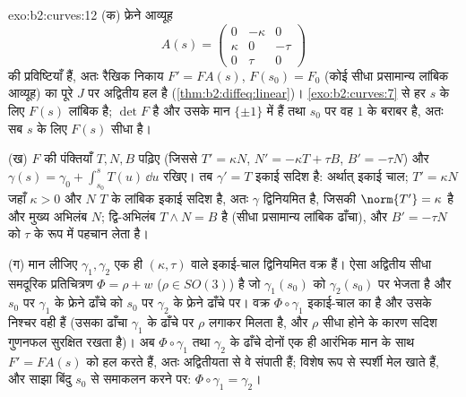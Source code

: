 \begin{solution}{exo:b2:curves:12}
(क) फ्रेने आव्यूह
\[
A(s) = \begin{pmatrix} 0 & -\kappa & 0\\ \kappa & 0 & -\tau\\
0 & \tau & 0\end{pmatrix}
\]
की प्रविष्टियाँ  हैं, अतः रैखिक निकाय $F' = FA(s)$,
$F(s_0) = F_0$ (कोई सीधा प्रसामान्य लांबिक आव्यूह) का पूरे $J$ पर
अद्वितीय हल है (\cref{thm:b2:diffeq:linear})। \cref{exo:b2:curves:7} से हर $s$ के लिए
$F(s)$ लांबिक है; $\det F$  है और उसके मान $\{\pm1\}$ में हैं तथा
$s_0$ पर वह $1$ के बराबर है, अतः सब $s$ के लिए $F(s)$ सीधा है।

(ख) $F$ की पंक्तियाँ $T, N, B$ पढ़िए (जिससे $T' = \kappa
N$, $N' = -\kappa T + \tau B$, $B' = -\tau N$) और
$\gamma(s) = \gamma_0 + \int_{s_0}^s T(u)\,\dd u$ रखिए। तब
$\gamma' = T$ इकाई सदिश है: अर्थात् इकाई चाल; $T' = \kappa N$
जहाँ $\kappa > 0$ और $N$ $T$ के लांबिक इकाई सदिश है, अतः $\gamma$
द्विनियमित है, जिसकी  $\norm{T'} = \kappa$ है और मुख्य
अभिलंब $N$; द्वि-अभिलंब $T \wedge N = B$ है
(सीधा प्रसामान्य लांबिक ढाँचा), और $B' = -\tau N$  को
$\tau$ के रूप में पहचान लेता है।

(ग) मान लीजिए $\gamma_1, \gamma_2$ एक ही $(\kappa, \tau)$ वाले इकाई-चाल द्विनियमित
वक्र हैं। ऐसा अद्वितीय सीधा समदूरिक प्रतिचित्रण $\Phi = \rho + w$ ($\rho \in SO(3)$) है
जो $\gamma_1(s_0)$ को $\gamma_2(s_0)$ पर भेजता है और $s_0$ पर $\gamma_1$ के
फ्रेने ढाँचे को $s_0$ पर $\gamma_2$ के फ्रेने ढाँचे पर। वक्र
$\Phi\circ\gamma_1$ इकाई-चाल का है और उसके निश्चर वही हैं
(उसका ढाँचा $\gamma_1$ के ढाँचे पर $\rho$ लगाकर मिलता है, और
$\rho$ सीधा होने के कारण सदिश गुणनफल सुरक्षित रखता है)। अब
$\Phi\circ\gamma_1$ तथा $\gamma_2$ के ढाँचे दोनों एक ही आरंभिक मान के साथ $F' =
FA(s)$
को हल करते हैं, अतः अद्वितीयता से वे संपाती हैं; विशेष रूप से स्पर्शी
मेल खाते हैं, और साझा बिंदु $s_0$ से समाकलन करने पर: $\Phi\circ\gamma_1 = \gamma_2$।
\end{solution}

